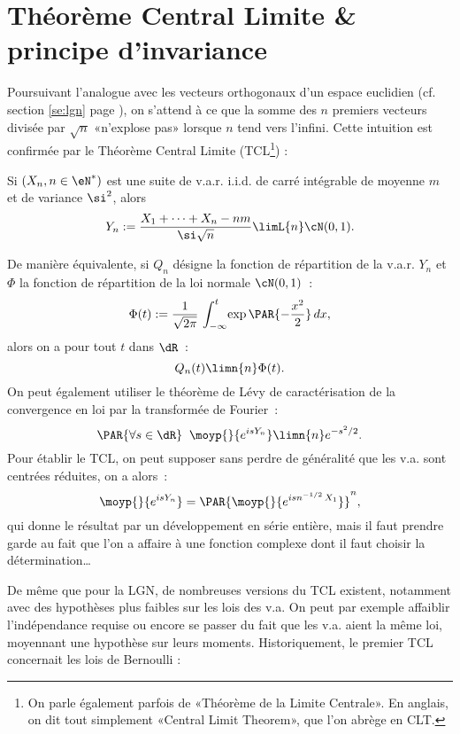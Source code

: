 %
\section{Théorème Central Limite \& principe d'invariance}\label{se:tcl}
%

Poursuivant l'analogue avec les vecteurs orthogonaux d'un espace euclidien
(cf. section \ref{se:lgn} page \pageref{se:lgn}), on s'attend à ce que la
somme des $n$ premiers vecteurs divisée par $\sqrt{n}$ «n'explose pas» lorsque
$n$ tend vers l'infini. Cette intuition est confirmée par le Théorème Central
Limite (TCL\footnote{On parle également parfois de «Théorème de la Limite
  Centrale».  En anglais, on dit tout simplement «Central Limit Theorem», que
  l'on abrège en CLT.}) :
\begin{thm}
  Si $(X_n,n\in\eN^*)$ est une suite de v.a.r. i.i.d. de carré intégrable de
  moyenne $m$ et de variance $\si^2$, alors
  $$Y_n:=\frac{X_1+\cdots+X_n-nm}{\si\sqrt{n}}\limL{n}\cN(0,1).$$
\end{thm}
De manière équivalente, si $Q_n$ désigne la fonction de répartition de la
v.a.r. $Y_n$ et $\Phi$ la fonction de répartition de la loi normale $\cN(0,1)$~:
$$
\Phi(t):=\frac{1}{\sqrt{2\pi}}\,\int_{-\infty}^t\!\exp\PAR{-\frac{x^2}{2}}\,dx,
$$
alors on a pour tout $t$ dans $\dR$~:
$$
Q_n(t)\limn{n}\Phi(t).
$$
On peut également utiliser le théorème de Lévy de caractérisation de la
convergence en loi par la transformée de Fourier~:
$$
\PAR{\forall s\in\dR}\;\; \moyp{}{e^{isY_n}} \limn{n} e^{-s^2/2}.
$$
Pour établir le TCL, on peut supposer sans perdre de généralité que les
v.a. sont centrées réduites, on a alors~:
$$
\moyp{}{e^{isY_n}}=\PAR{\moyp{}{e^{isn^{-1/2}\,X_1}}}^n,
$$
qui donne le résultat par un développement en série entière, mais il faut
prendre garde au fait que l'on a affaire à une fonction complexe dont il faut
choisir la détermination\ldots

De même que pour la LGN, de nombreuses versions du TCL existent, notamment
avec des hypothèses plus faibles sur les lois des v.a. On peut par exemple
affaiblir l'indépendance requise ou encore se passer du fait que les v.a.
aient la même loi, moyennant une hypothèse sur leurs moments. Historiquement,
le premier TCL concernait les lois de Bernoulli :

